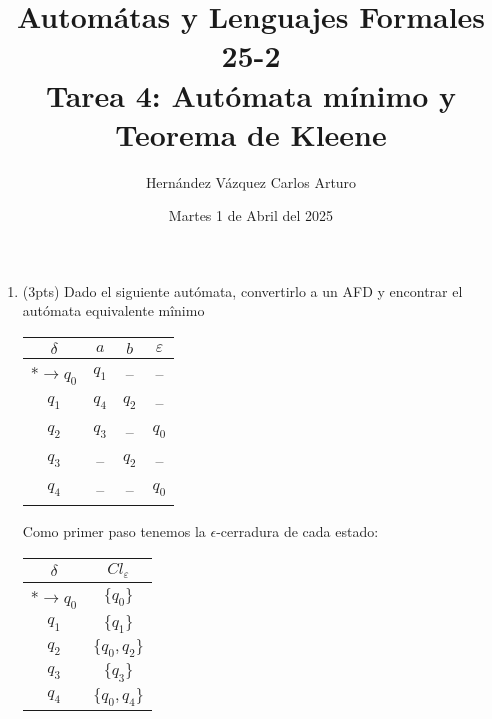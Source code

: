 \documentclass{article}
\title{Automátas y Lenguajes Formales 25-2 \\ Tarea 4: Autómata mínimo y Teorema de Kleene}
\author{Hernández Vázquez Carlos Arturo }
\date{Martes 1 de Abril del 2025}
\begin{document}
\maketitle

\begin{enumerate}
    \item (3pts) Dado el siguiente autómata, convertirlo a un AFD y encontrar el autómata equivalente mînimo
        \begin{table}[h]
          \centering
          \begin{tabular}{c|c|c|c}
              $\delta$ & $a$ & $b$ & $\varepsilon$ \\ \hline
              *$\rightarrow q_0$ & $q_1$ & -- & -- \\
              $q_1$ & $q_4$ & $q_2$ & -- \\
              $q_2$ & $q_3$ & -- & $q_0$ \\
              $q_3$ & -- & $q_2$ & -- \\
              $q_4$ & -- & -- & $q_0$
          \end{tabular}
        \end{table}

        Como primer paso tenemos la $\epsilon$-cerradura de cada estado:
        \begin{table}[h]
          \centering
          \begin{tabular}{c|c}
              $\delta$ & $Cl_\varepsilon$ \\ \hline
              *$\rightarrow q_0$ & $\{q_0\}$ \\
              $q_1$ & $\{q_1\}$\\
              $q_2$ & $\{q_0, q_2\}$ \\
              $q_3$ & $\{q_3\}$ \\
              $q_4$ & $\{q_0, q_4\}$
          \end{tabular}
        \end{table}
        

\end{enumerate}
\end{document}

